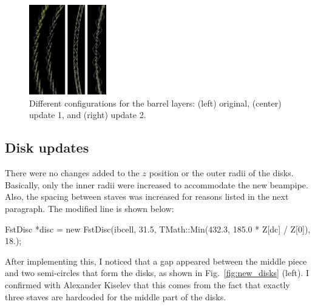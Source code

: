 \documentclass[12pt]{article}
\begin{document}
\begin{figure}[H]
\centering
\includegraphics[width=0.3\textwidth]{figures/barrel_upgrades.jpg}
\caption{Different configurations for the barrel layers: (left) original, (center) update 1, and (right) update 2.}
\label{fig:barrel_upgrades}
\end{figure}

\subsection{Disk updates}

There were no changes added to the $z$ position or the outer radii of the disks. Basically, only the inner radii were increased to accommodate the new beampipe.
Also, the spacing between staves was increased for reasons listed in the next paragraph. The modified line is shown below:

\begin{tcolorbox}
\begin{verbnobox}[\scriptsize]
FstDisc *disc = new FstDisc(ibcell, 31.5, TMath::Min(432.3, 185.0 * Z[dc] / Z[0]), 18.);
\end{verbnobox}  
\end{tcolorbox}

After implementing this, I noticed that a gap appeared between the middle piece and two semi-circles that
form the disks, as shown in Fig.~\ref{fig:new_disks} (left). I confirmed with Alexander Kiselev that this comes from the fact that
exactly three staves are hardcoded for the middle part of the disks.
\end{document}
